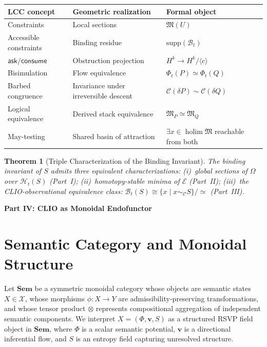 \documentclass[11pt, letterpaper]{article}
\theoremstyle{plain}
\newtheorem{theorem}{Theorem}[section]
\theoremstyle{definition}
\theoremstyle{remark}
\newcommand{\BI}{\mathcal{B}}
\newcommand{\CC}{\mathcal{C}}
\newcommand{\HH}{\mathcal{H}}
\newcommand{\MM}{\mathfrak{M}}
\newcommand{\EE}{\mathcal{E}}
\newcommand{\holim}{\operatorname{holim}}
\newcommand{\Sem}{\mathbf{Sem}}
\begin{document}
\begin{center}
\begin{tabular}{@{}lll@{}}
\toprule
LCC concept & Geometric realization & Formal object \\
\midrule
Constraints & Local sections & $\MM(U)$ \\
Accessible constraints & Binding residue & $\mathrm{supp}(\BI_t)$ \\
$\mathsf{ask}/\mathsf{consume}$ & Obstruction projection & $H^k \to H^k/\langle c\rangle$ \\
Bisimulation & Flow equivalence & $\Phi_t(P) \simeq \Phi_t(Q)$ \\
Barbed congruence & Invariance under irreversible descent & $\CC(\delta P) \sim \CC(\delta Q)$ \\
Logical equivalence & Derived stack equivalence & $\MM_P \simeq \MM_Q$ \\
May-testing & Shared basin of attraction & $\exists x \in \holim\MM$ reachable from both \\
\bottomrule
\end{tabular}
\end{center}

\begin{theorem}[Triple Characterization of the Binding Invariant]
\label{thm:char}
The binding invariant of $S$ admits three equivalent characterizations:
(i)~global sections of $\Omega$ over $\HH_t(S)$ (Part~I);
(ii)~homotopy-stable minima of $\EE$ (Part~II);
(iii)~the CLIO-observational equivalence class:
$\BI_t(S) \cong \{x \mid x \sim_\CC S\} / {\simeq}$ (Part~III).
\end{theorem}


\vspace{1.2em}
\begin{center}{\large\bfseries Part IV: CLIO as Monoidal Endofunctor}\end{center}
\vspace{0.5em}

\section{Semantic Category and Monoidal Structure}

Let $\Sem$ be a symmetric monoidal category whose objects are semantic states
$X \in \mathcal{X}$, whose morphisms $\phi: X \to Y$ are admissibility-preserving
transformations, and whose tensor product $\otimes$ represents compositional
aggregation of independent semantic components. We interpret $X = (\Phi, \mathbf{v}, S)$
as a structured RSVP field object in $\Sem$, where $\Phi$ is a scalar semantic
potential, $\mathbf{v}$ is a directional inferential flow, and $S$ is an entropy field
capturing unresolved structure.
\end{document}
